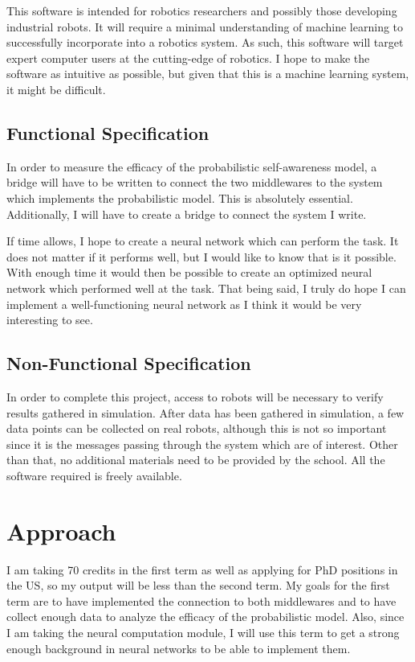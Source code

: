 \documentclass[10pt, a4paper]{article}
\begin{document}
This software is intended for robotics researchers and possibly those
developing industrial robots. It will require a minimal understanding
of machine learning to successfully incorporate into a robotics
system. As such, this software will target expert computer users at
the cutting-edge of robotics. I hope to make the software as intuitive
as possible, but given that this is a machine learning system, it
might be difficult.

\subsection*{Functional Specification}

In order to measure the efficacy of the probabilistic self-awareness
model, a bridge will have to be written to connect the two middlewares
to the system which implements the probabilistic model. This is
absolutely essential. Additionally, I will have to create a bridge to
connect the system I write. 

If time allows, I hope to create a neural network which can perform
the task. It does not matter if it performs well, but I would like to
know that is it possible. With enough time it would then be possible
to create an optimized neural network which performed well at the
task. That being said, I truly do hope I can implement a
well-functioning neural network as I think it would be very
interesting to see.

\subsection*{Non-Functional Specification}

In order to complete this project, access to robots will be necessary
to verify results gathered in simulation. After data has been
gathered in simulation, a few data points can be collected on real
robots, although this is not so important since it is the messages
passing through the system which are of interest. Other than that, no
additional materials need to be provided by the school. All the
software required is freely available.

\section*{Approach}

I am taking 70 credits in the first term as well as applying for PhD
positions in the US, so my output will be less than the second
term. My goals for the first term are to have implemented the
connection to both middlewares and to have collect enough data to
analyze the efficacy of the probabilistic model. Also, since I am
taking the neural computation module, I will use this term to get a
strong enough background in neural networks to be able to implement
them.
\end{document}
